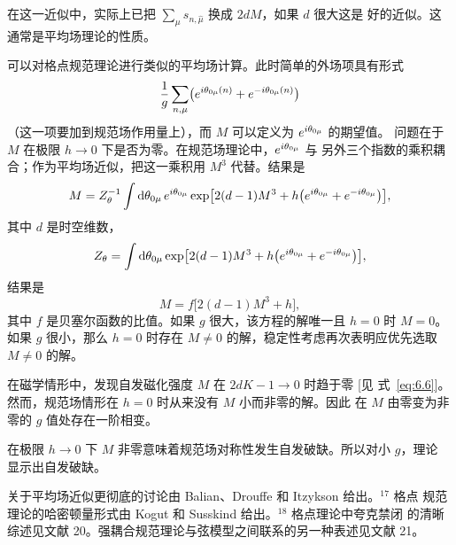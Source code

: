 在这一近似中，实际上已把 $\sum_{\mu}s_{n,\hat\mu}$ 换成 $2dM$，如果 $d$ 很大这是
好的近似。这通常是平均场理论的性质。

可以对格点规范理论进行类似的平均场计算。此时简单的外场项具有形式
\[
\frac{1}{g}\sum_{n,\mu}\bigl(e^{i\theta_{0\mu}(n)}+e^{-i\theta_{0\mu}(n)}\bigr)
\]
（这一项要加到规范场作用量上），而 $M$ 可以定义为 $e^{i\theta_{0\mu}}$ 的期望值。
问题在于 $M$ 在极限 $h\to0$ 下是否为零。在规范场理论中，$e^{i\theta_{0\mu}}$ 与
另外三个指数的乘积耦合；作为平均场近似，把这一乘积用 $M^{3}$ 代替。结果是
\begin{equation}
M = Z_{\theta}^{-1}\int\mathrm{d}\theta_{0\mu}\,e^{i\theta_{0\mu}}
  \exp\bigl[2(d-1)M^{3}+h\bigl(e^{i\theta_{0\mu}}+e^{-i\theta_{0\mu}}\bigr)\bigr],
\label{eq:6.7}
\end{equation}
其中 $d$ 是时空维数，
\begin{equation}
Z_{\theta} = \int\mathrm{d}\theta_{0\mu}
  \exp\bigl[2(d-1)M^{3}+h\bigl(e^{i\theta_{0\mu}}+e^{-i\theta_{0\mu}}\bigr)\bigr],
\label{eq:6.8}
\end{equation}
结果是
\begin{equation}
M = f\bigl[2(d-1)M^{3}+h\bigr],
\label{eq:6.9}
\end{equation}
其中 $f$ 是贝塞尔函数的比值。如果 $g$ 很大，该方程的解唯一且 $h=0$ 时 $M=0$。
如果 $g$ 很小，那么 $h=0$ 时存在 $M\ne0$ 的解，稳定性考虑再次表明应优先选取
$M\ne0$ 的解。

在磁学情形中，发现自发磁化强度 $M$ 在 $2dK-1\to0$ 时趋于零 [见
式~\eqref{eq:6.6}]。然而，规范场情形在 $h=0$ 时从来没有 $M$ 小而非零的解。因此
在 $M$ 由零变为非零的 $g$ 值处存在一阶相变。

在极限 $h\to0$ 下 $M$ 非零意味着规范场对称性发生自发破缺。所以对小 $g$，理论
显示出自发破缺。

关于平均场近似更彻底的讨论由 Balian、Drouffe 和 Itzykson 给出。${}^{17}$ 格点
规范理论的哈密顿量形式由 Kogut 和 Susskind 给出。${}^{18}$ 格点理论中夸克禁闭
的清晰综述见文献 20。强耦合规范理论与弦模型之间联系的另一种表述见文献 21。
